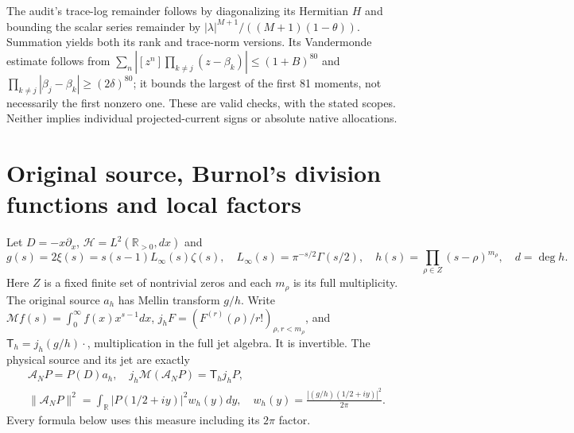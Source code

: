 \documentclass[11pt]{article}
\theoremstyle{remark}\newtheorem{remark}[theorem]{Remark}
\begin{document}
The audit's trace-log remainder follows by diagonalizing its Hermitian
$H$ and bounding the scalar series remainder by
$|\lambda|^{M+1}/((M+1)(1-\theta))$. Summation yields both its
rank and trace-norm versions. Its Vandermonde estimate follows from
$\sum_n|[z^n]\prod_{k\ne j}(z-\beta_k)|\le(1+B)^{80}$ and
$\prod_{k\ne j}|\beta_j-\beta_k|\ge(2\delta)^{80}$; it bounds
the largest of the first 81 moments, not necessarily the first nonzero
one. These are valid checks, with the stated scopes. Neither implies
individual projected-current signs or absolute native allocations.

\section{Original source, Burnol's division functions and local factors}
Let $D=-x\partial_x$, $\mathcal H=L^2(\mathbb R_{>0},dx)$ and
\[
 g(s)=2\xi(s)=s(s-1)L_\infty(s)\zeta(s),\quad
 L_\infty(s)=\pi^{-s/2}\Gamma(s/2),\quad
 h(s)=\prod_{\rho\in Z}(s-\rho)^{m_\rho},\quad d=\deg h.\tag{LR1}
\]
Here $Z$ is a fixed finite set of nontrivial zeros and each $m_\rho$ is
its full multiplicity. The original source $a_h$ has Mellin transform
$g/h$. Write $\mathcal M f(s)=\int_0^\infty f(x)x^{s-1}dx$,
$j_hF=(F^{(r)}(\rho)/r!)_{\rho,r<m_\rho}$, and
$\mathsf T_h=j_h(g/h)\cdot$, multiplication in the full jet algebra.
It is invertible. The physical source and its jet are exactly
\[
 \begin{gathered}
 \mathcal A_NP=P(D)a_h,\quad j_h\mathcal M(\mathcal A_NP)
 =\mathsf T_hj_hP,\\
 \|\mathcal A_NP\|^2=\int_{\mathbb R}|P(1/2+iy)|^2w_h(y)dy,
 \quad w_h(y)=\frac{|(g/h)(1/2+iy)|^2}{2\pi}.
 \end{gathered}\tag{LR2}
\]
Every formula below uses this measure including its $2\pi$ factor.
\end{document}

